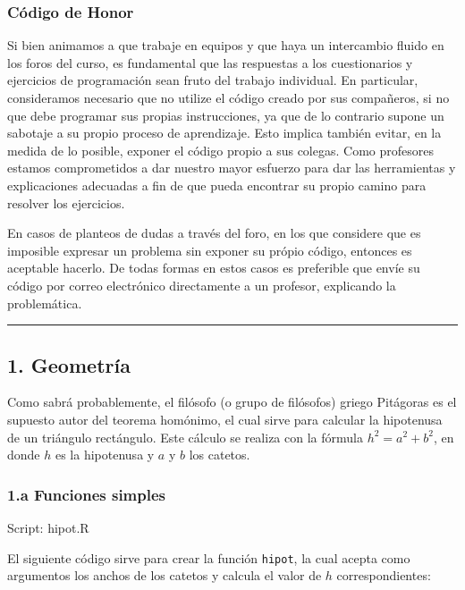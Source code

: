 \documentclass[]{article}
\begin{document}
\subsubsection{Código de Honor}

Si bien animamos a que trabaje en equipos y que haya un intercambio
fluido en los foros del curso, es fundamental que las respuestas a los
cuestionarios y ejercicios de programación sean fruto del trabajo
individual. En particular, consideramos necesario que no utilize el
código creado por sus compañeros, si no que debe programar sus propias
instrucciones, ya que de lo contrario supone un sabotaje a su propio
proceso de aprendizaje. Esto implica también evitar, en la medida de lo
posible, exponer el código propio a sus colegas. Como profesores estamos
comprometidos a dar nuestro mayor esfuerzo para dar las herramientas y
explicaciones adecuadas a fin de que pueda encontrar su propio camino
para resolver los ejercicios.

En casos de planteos de dudas a través del foro, en los que considere
que es imposible expresar un problema sin exponer su própio código,
entonces es aceptable hacerlo. De todas formas en estos casos es
preferible que envíe su código por correo electrónico directamente a un
profesor, explicando la problemática.

\begin{center}\rule{3in}{0.4pt}\end{center}

\subsection{1. Geometría}

Como sabrá probablemente, el filósofo (o grupo de filósofos) griego
Pitágoras es el supuesto autor del teorema homónimo, el cual sirve para
calcular la hipotenusa de un triángulo rectángulo. Este cálculo se
realiza con la fórmula $h^2 = a^2 + b^2$, en donde $h$ es la hipotenusa
y $a$ y $b$ los catetos.

\subsubsection{1.a Funciones simples}

Script: hipot.R

El siguiente código sirve para crear la función \texttt{hipot}, la cual
acepta como argumentos los anchos de los catetos y calcula el valor de
$h$ correspondientes:
\end{document}
